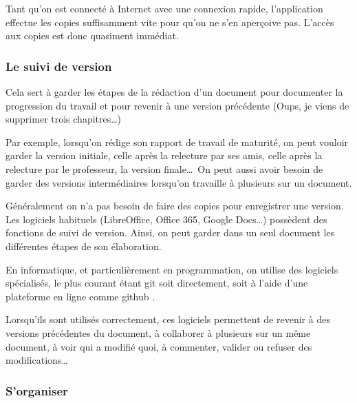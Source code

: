 \documentclass[10pt,a4paper]{report}
\begin{document}

Tant qu'on est connecté à Internet avec une connexion rapide, l'application effectue les copies suffisamment vite pour qu'on ne s'en aperçoive pas. L'accès aux copies est donc quasiment immédiat.



\subsubsection{Le suivi de version}

Cela sert à garder les étapes de la rédaction d'un document pour documenter la progression du travail et pour revenir à une version précédente (Oups, je viens de supprimer trois chapitres\dots)

Par exemple, lorsqu'on rédige son rapport de travail de maturité, on peut vouloir garder la version initiale, celle après la relecture par ses amis, celle après la relecture par le professeur, la version finale\dots \ On peut aussi avoir besoin de garder des versions intermédiaires lorsqu'on travaille à plusieurs sur un document.

Généralement on n'a pas besoin de faire des copies pour enregistrer une version. Les logiciels habituels (LibreOffice, Office 365, Google Docs\dots) possèdent des fonctions de suivi de version. Ainsi, on peut garder dans un seul document les différentes étapes de son élaboration.

En informatique, et particulièrement en programmation, on utilise des logiciels spécialisés, le plus courant étant git\autocite{Git} soit directement, soit à l'aide d'une plateforme en ligne comme github \autocite{GitHubWhereWorld}.

Lorsqu'ils sont utilisés correctement, ces logiciels permettent de revenir à des versions précédentes du document, à collaborer à plusieurs sur un même document, à voir qui a modifié quoi, à commenter, valider ou refuser des modifications\dots


\subsubsection{S'organiser}
\end{document}
